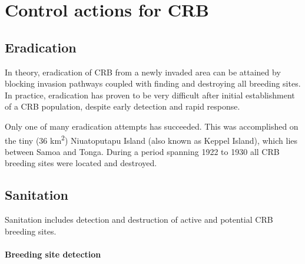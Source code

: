 \documentclass[twocolumn,letterpaper]{scrartcl}
\begin{document}
\section{Control actions for CRB}

\subsection{Eradication}

In theory, eradication of CRB from a newly invaded area can be attained by blocking invasion pathways coupled with finding and destroying all breeding sites. In practice, eradication has proven to be very difficult after initial establishment of a CRB population, despite early detection and rapid response. 

Only one of many eradication attempts has succeeded. This was accomplished on the tiny (36 km\textsuperscript{2}) Niuatoputapu Island (also known as Keppel Island), which lies between Samoa and Tonga. During a period spanning 1922 to 1930 all CRB breeding sites were located and destroyed.


%

\subsection{Sanitation}

Sanitation includes detection and destruction of active and potential CRB breeding sites.

\paragraph{Breeding site detection}
\end{document}
